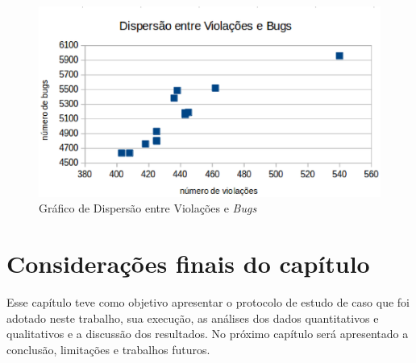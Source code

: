 \begin{figure}[h!]
\centering
\includegraphics[keepaspectratio=false,scale=0.40]{figuras/figuras_nilton/dispersaoviolacoesbugs.eps}
\caption{Gráfico de Dispersão entre Violações e \textit{Bugs}}
\label{dispersaoviolacoesbugs}
\end{figure}


\section{Considerações finais do capítulo}

Esse capítulo teve como objetivo apresentar o protocolo de estudo de caso que foi adotado neste trabalho, sua execução, as análises dos dados quantitativos e qualitativos e a discussão dos resultados. No próximo capítulo será apresentado a conclusão, limitações e trabalhos futuros.